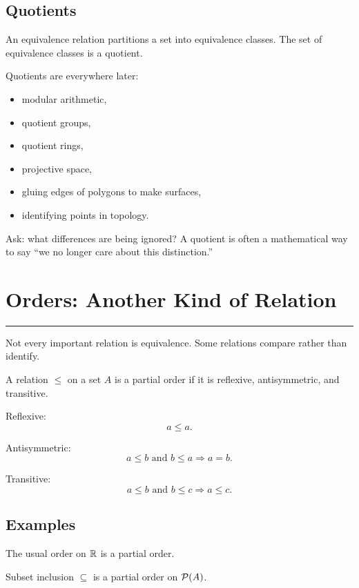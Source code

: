 \documentclass[12pt]{article}
\newcommand{\chapterline}{\vspace{0.4em}\hrule\vspace{0.8em}}
\begin{document}
\subsection{Quotients}

An equivalence relation partitions a set into equivalence classes. The set of equivalence classes is a quotient.

Quotients are everywhere later:

\begin{itemize}
\item modular arithmetic,
\item quotient groups,
\item quotient rings,
\item projective space,
\item gluing edges of polygons to make surfaces,
\item identifying points in topology.
\end{itemize}

\begin{walkbox}
Ask: what differences are being ignored? A quotient is often a mathematical way to say ``we no longer care about this distinction.''
\end{walkbox}

\newpage
\section{Orders: Another Kind of Relation}
\chapterline

Not every important relation is equivalence. Some relations compare rather than identify.

\begin{definition}
A relation $\leq$ on a set $A$ is a partial order if it is reflexive, antisymmetric, and transitive.
\end{definition}

Reflexive:
\[
a\leq a.
\]

Antisymmetric:
\[
a\leq b\text{ and }b\leq a\Rightarrow a=b.
\]

Transitive:
\[
a\leq b\text{ and }b\leq c\Rightarrow a\leq c.
\]

\subsection{Examples}

The usual order on $\mathbb{R}$ is a partial order.

Subset inclusion $\subseteq$ is a partial order on $\mathcal{P}(A)$.
\end{document}
